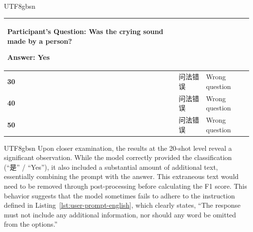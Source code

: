 \documentclass[conference]{IEEEtran}
\begin{document}
\begin{table}[h!]
\begin{CJK*}{UTF8}{gbsn}
{\begin{tabular}{|l|p{6.5cm}|p{10cm}|}
Participant’s Question: Was the crying sound made by a person?

Answer: Yes \\ \hline
\textbf{30} & 问法错误 & Wrong question \\ \hline
\textbf{40} & 问法错误 & Wrong question \\ \hline
\textbf{50} & 问法错误 & Wrong question \\ \hline
\end{tabular}
}
\end{CJK*}
\end{table}

\begin{CJK*}{UTF8}{gbsn}
Upon closer examination, the results at the 20-shot level reveal a significant observation. While the model correctly provided the classification (“是” / “Yes”), it also included a substantial amount of additional text, essentially combining the prompt with the answer. This extraneous text would need to be removed through post-processing before calculating the F1 score. This behavior suggests that the model sometimes fails to adhere to the instruction defined in Listing~\ref{lst:user-prompt-english}, which clearly states, “The response must not include any additional information, nor should any word be omitted from the options.”
\end{CJK*}

\fi
\end{document}
